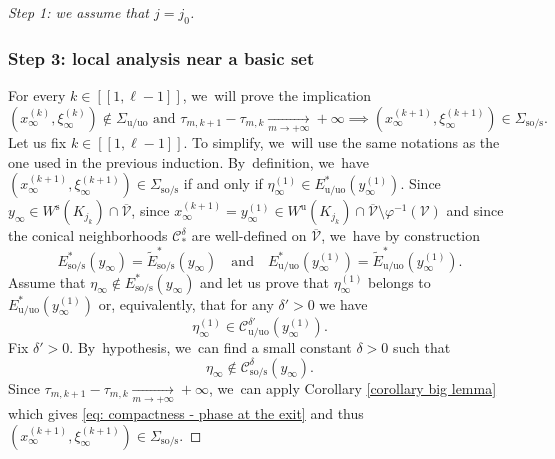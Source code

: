 \documentclass[11pt]{article}
\newcommand{\lcr}{[\![}
\newcommand{\rcr}{]\!]}
\newcommand{\rs}{\mathrm{s}}
\newcommand{\rso}{\mathrm{so}}
\newcommand{\ru}{\mathrm{u}}
\newcommand{\ruo}{\mathrm{uo}}
\theoremstyle{definition}
\theoremstyle{plain}
\newcommand{\Ccal}{\mathcal{C}}
\newcommand{\Vcal}{\mathcal{V}}
\begin{document}
\begin{proof}[Step 1: we assume that $j = j_0$]
\subsubsection*{Step 3: local analysis near a basic set}
For every $k\in\lcr1,\ell-1\rcr$, we~will prove the implication
\begin{equation}\label{eq: compactness - proof implication}
(x_{\infty}^{(k)}, \xi_{\infty}^{(k)}) \!\notin\! \Sigma_{\ru/\ruo} \text{ and } \tau_{m,k +1} - \tau_{m,k} \!\underset{m\to+\infty}{\to}\! + \infty \implies (x_{\infty}^{(k+1)}, \xi_{\infty}^{(k+1)}) \!\in\! \Sigma_{\rso/\rs}.
\end{equation}
Let us fix $k\in\lcr1,\ell-1\rcr$. To simplify, we~will use the same notations as the one used in the previous induction. By~definition, we~have $(x_\infty^{(k+1)},\xi_\infty^{(k+1)}) \in \Sigma_{\rso/\rs}$ if and only if $\eta_{\infty}^{(1)} \in E_{\ru/\ruo}^* (y_{\infty}^{(1)})$. Since $y_{\infty} \in W^\rs (K_{j_k}) \cap \overline{\Vcal}$, since $x_{\infty}^{(k+1)} = y_{\infty}^{(1)} \in W^\ru (K_{j_k}) \cap \overline{\Vcal} \setminus \varphi^{-1} (\Vcal)$ and since the conical neighborhoods $\Ccal_{*}^{\delta}$ are well-defined on $\overline{\Vcal}$, we~have by construction
\[
E_{\rso/\rs}^* (y_{\infty}) = \widetilde{E}_{\rso/\rs}^* (y_{\infty}) \quad \text{and} \quad E_{\ru/\ruo}^* (y_{\infty}^{(1)}) = \widetilde{E}_{\ru/\ruo}^* (y_{\infty}^{(1)}).
\]
Assume that $\eta_{\infty} \notin E_{\rso/\rs}^* (y_{\infty})$ and let us prove that $\eta_{\infty}^{(1)}$ belongs to $E_{\ru/\ruo}^* (y_{\infty}^{(1)})$ or, equivalently, that for any $\delta' > 0$ we have
\begin{equation}\label{eq: compactness - phase at the exit}
\eta_{\infty}^{(1)} \in \Ccal_{\ru/\ruo}^{\delta'} (y_{\infty}^{(1)}).
\end{equation}
Fix $\delta' > 0$. By~hypothesis, we~can find a small constant $\delta > 0$ such that
\[
\eta_{\infty} \notin \Ccal_{\rso/\rs}^{\delta} (y_{\infty}).
\]
Since $\tau_{m,k +1} - \tau_{m,k} \underset{m\to+\infty}{\to} + \infty$, we~can apply Corollary \ref{corollary big lemma} which gives \eqref{eq: compactness - phase at the exit} and thus $(x_{\infty}^{(k+1)}, \xi_{\infty}^{(k+1)}) \in \Sigma_{\rso/\rs}$.


\end{proof}
\end{document}
